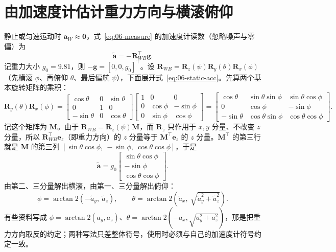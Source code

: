 \section{由加速度计估计重力方向与横滚俯仰}\label{sec:06-gravity}

静止或匀速运动时 $\bm{a}_W\approx\bm{0}$，式~\eqref{eq:06-measure} 的加速度计读数（忽略噪声与零偏）为
\begin{equation}
  \tilde{\bm{a}} = -\bm{R}_{WB}^{\top}\bm{g}.
  \label{eq:06-static-acc}
\end{equation}
记重力大小 $g_0=9.81$，则 $-\bm{g}=[0,0,g_0]^{\top}$。设 $\bm{R}_{WB}=\bm{R}_z(\psi)\bm{R}_y(\theta)\bm{R}_x(\phi)$（先横滚 $\phi$、再俯仰 $\theta$、最后偏航 $\psi$），下面展开式~\eqref{eq:06-static-acc}。先算两个基本旋转矩阵的乘积：
\begin{equation}
  \bm{R}_y(\theta)\bm{R}_x(\phi)
  = \begin{bmatrix}
    \cos\theta & 0 & \sin\theta\\
    0 & 1 & 0\\
    -\sin\theta & 0 & \cos\theta
  \end{bmatrix}
  \begin{bmatrix}
    1 & 0 & 0\\
    0 & \cos\phi & -\sin\phi\\
    0 & \sin\phi & \cos\phi
  \end{bmatrix}
  = \begin{bmatrix}
    \cos\theta & \sin\theta\sin\phi & \sin\theta\cos\phi\\
    0 & \cos\phi & -\sin\phi\\
    -\sin\theta & \cos\theta\sin\phi & \cos\theta\cos\phi
  \end{bmatrix}.
\end{equation}
记这个矩阵为 $\bm{M}$。由于 $\bm{R}_{WB}=\bm{R}_z(\psi)\bm{M}$，而 $\bm{R}_z$ 只作用于 $x,y$ 分量、不改变 $z$ 分量，所以 $\bm{R}_{WB}^{\top}\bm{e}_z$（即重力方向）的 $z$ 分量等于 $\bm{M}^{\top}\bm{e}_z$ 的 $z$ 分量。$\bm{M}^{\top}$ 的第三行就是 $\bm{M}$ 的第三列 $[\sin\theta\cos\phi,\ -\sin\phi,\ \cos\theta\cos\phi]$，于是
\begin{equation}
  \tilde{\bm{a}} = g_0\begin{bmatrix}
    \sin\theta\cos\phi\\
    -\sin\phi\\
    \cos\theta\cos\phi
  \end{bmatrix}.
  \label{eq:06-acc-expand}
\end{equation}
由第二、三分量解出横滚，由第一、三分量解出俯仰：
\begin{equation}
  \phi = \arctan2\left(-\tilde{a}_y,\ \tilde{a}_z\right),
  \qquad
  \theta = \arctan2\left(\tilde{a}_x,\ \sqrt{\tilde{a}_y^{2}+\tilde{a}_z^{2}}\right).
  \label{eq:06-roll-pitch}
\end{equation}
有些资料写成 $\phi=\arctan2(a_y,a_z)$、$\theta=\arctan2(-a_x,\sqrt{a_y^2+a_z^2})$，那是把重力方向取反的约定；两种写法只差整体符号，使用时必须与自己的加速度计符号约定一致。

